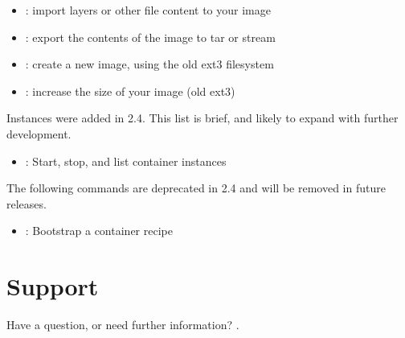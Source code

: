 \documentclass[letterpaper,10pt,english]{sphinxmanual}
\begin{document}
\begin{itemize}
\item {} 
{\hyperref[\detokenize{appendix:image-import}]{}} : import layers or other file content to your image

\item {} 
{\hyperref[\detokenize{appendix:image-export}]{}} : export the contents of the image to tar or stream

\item {} 
{\hyperref[\detokenize{appendix:image-create}]{}} : create a new image, using the old ext3 filesystem

\item {} 
{\hyperref[\detokenize{appendix:image-expand}]{}} : increase the size of your image (old ext3)

\end{itemize}

\begin{DUlineblock}{0em}
\item[] 
\item[] Instances were added in 2.4. This list is brief, and likely to expand
with further development.
\end{DUlineblock}
\begin{itemize}
\item {} 
{\hyperref[\detokenize{appendix:instance-command-group}]{}} : Start, stop, and list container instances

\end{itemize}

 The following commands are deprecated in 2.4 and
will be removed in future releases.
\begin{itemize}
\item {} 
{\hyperref[\detokenize{appendix:bootstrap}]{}} : Bootstrap a container recipe

\end{itemize}


\section{Support}
\label{\detokenize{introduction:support}}
Have a question, or need further information? .
\end{document}
